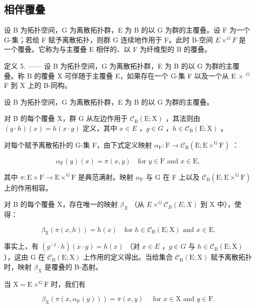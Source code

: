 \subsection{相伴覆叠}

设 B 为拓扑空间，G 为离散拓扑群，E 为 B 的以 G 为群的主覆叠。设 F 为一个 G-集；若给 F 赋予离散拓扑，则群 G 连续地作用于 F。此时 B-空间 \(E \times^{G} F\) 是一个覆叠。它称为与主覆叠 E 相伴的、以 F 为纤维型的 B 的覆叠。

定义 5. —— 设 B 为拓扑空间，G 为离散拓扑群，E 为 B 的以 G 为群的主覆叠。称 B 的覆叠 X 可伴随于主覆叠 E，如果存在一个 G-集 F 以及一个从 E × \(^{G}\) F 到 X 上的 B-同构。

设 B 为拓扑空间，G 为离散拓扑群，E 为 B 的以 G 为群的主覆叠。

对 B 的每个覆叠 X，群 G 从左边作用于 \(\mathcal{C}_{\mathrm{B}}(\mathrm{E};\mathrm{X})\) ，其法则由 \((g\cdot h)(x)=h(x\cdot g)\) 定义，其中 \(x\in E\) ，\(g\in G\) ，\(h\in\mathcal{C}_{\mathrm{B}}(\mathrm{E};\mathrm{X})\) 。

对每个赋予离散拓扑的 G-集 F，由下式定义映射 \(\alpha_{\mathrm{F}}\colon \mathrm{F}\to \mathcal{C}_{\mathrm{B}}(\mathrm{E};\mathrm{E}\times^{\mathrm{G}}\mathrm{F})\) ：

\[
\alpha_ {\mathrm{F}} (y) (x) = \pi (x, y) \quad \text {for } y \in \mathrm{F} \text { and } x \in \mathrm{E},\tag{2}
\]

其中 \(\pi\colon\mathrm{E}\times\mathrm{F}\to\mathrm{E}\times^{\mathrm{G}}\mathrm{F}\) 是典范满射。映射 \(\alpha_{\mathrm{F}}\) 与 G 在 F 上以及 \(\mathcal{C}_{\mathrm{B}}(\mathrm{E};\mathrm{E}\times^{\mathrm{G}}\mathrm{F})\) 上的作用相容。

对 B 的每个覆叠 X，存在唯一的映射 \(\beta_{X}\) （从 \(E \times^{G} \mathcal{C}_{B}(E; X)\) 到 X 中），使得：

\[
\beta_ {\mathrm{X}} (\pi (x, h)) = h (x) \quad \text {for } h \in \mathcal {C} _ {\mathrm{B}} (\mathrm{E}; \mathrm{X}) \text { and } x \in \mathrm{E}.\tag{3}
\]

事实上，有 \((g^{-1}\cdot h)(x\cdot g)=h(x)\) （对 \(x\in E\) ，\(g\in G\) 与 \(h\in\mathcal{C}_{\mathrm{B}}(\mathrm{E};\mathrm{X})\) ），这由 G 在 \(\mathcal{C}_{\mathrm{B}}(\mathrm{E};\mathrm{X})\) 上作用的定义得出。当给集合 \(\mathcal{C}_{\mathrm{B}}(\mathrm{E};\mathrm{X})\) 赋予离散拓扑时，映射 \(\beta_{X}\) 是覆叠的 B-态射。

当 \(\mathrm{X} = \mathrm{E}\times^{\mathrm{G}}\mathrm{F}\) 时，我们有

\[
\beta_ {\mathrm{X}} \left(\pi \left(x, \alpha_ {\mathrm{F}} (y)\right)\right) = \pi (x, y) \quad \text {   for   } x \in \mathrm{X} \text {   and   } y \in \mathrm{F}.\tag{4}
\]

